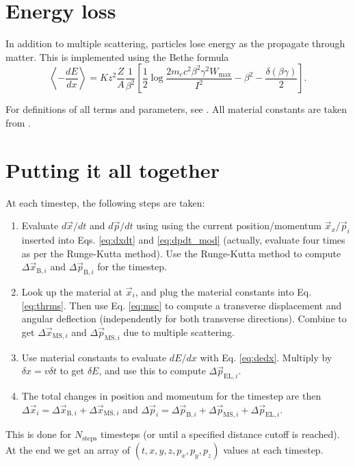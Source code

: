 \documentclass[12pt]{article}
\begin{document}
\section{Energy loss}
In addition to multiple scattering, particles lose energy as the propagate through matter. This is implemented using the 
Bethe formula
\begin{equation}\label{eq:dedx}
\left\langle-\frac{dE}{dx}\right\rangle = Kz^2\frac{Z}{A}\frac{1}{\beta^2}\left[\frac{1}{2}\log\frac{2m_ec^2\beta^2\gamma^2W_\text{max}}{I^2} - \beta^2 - \frac{\delta(\beta\gamma)}{2} \right].
\end{equation}

For definitions of all terms and parameters, see \cite{PDG_matter}. All material constants are taken from \cite{PDG_properties}.

\section{Putting it all together}
At each timestep, the following steps are taken:
\begin{enumerate}
\item Evaluate $d\vec{x}/dt$ and $d\vec{p}/dt$ using using the current position/momentum $\vec{x}_x/\vec{p}_i$ inserted into Eqs. \ref{eq:dxdt} and \ref{eq:dpdt_mod} (actually,
evaluate four times as per the Runge-Kutta method). Use the Runge-Kutta method to compute $\Delta\vec{x}_{\text{B},i}$ and $\Delta\vec{p}_{\text{B},i}$ for the timestep.
\item Look up the material at $\vec{x}_i$, and plug the material constants into Eq. \ref{eq:thrms}. Then use Eq. \ref{eq:msc} to compute a transverse displacement
and angular deflection (independently for both transverse directions). Combine to get $\Delta\vec{x}_{\text{MS},i}$ and $\Delta\vec{p}_{\text{MS},i}$ due to multiple scattering.
\item Use material constants to evaluate $dE/dx$ with Eq. \ref{eq:dedx}. Multiply by $\delta x=v\delta t$ to get $\delta E$, and use this to compute $\Delta\vec{p}_{\text{EL},i}$.
\item The total changes in position and momentum for the timestep are then $\Delta\vec{x}_i = \Delta\vec{x}_{\text{B},i}+\Delta\vec{x}_{\text{MS},i}$ and
$\Delta\vec{p}_i = \Delta\vec{p}_{\text{B},i}+\Delta\vec{p}_{\text{MS},i}+\Delta\vec{p}_{\text{EL},i}$.
\end{enumerate}

This is done for $N_\text{steps}$ timesteps (or until a specified distance cutoff is reached). At the end we get an array of $(t,x,y,z,p_x,p_y,p_z)$ values at each timestep.
\end{document}
